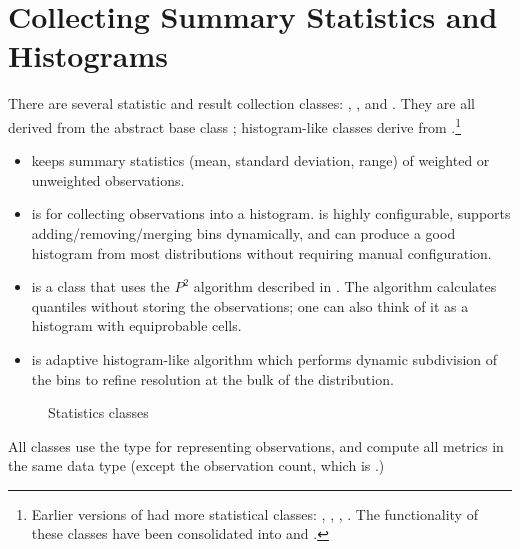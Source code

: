 \section{Collecting Summary Statistics and Histograms}
\label{sec:sim-lib:statistics}

There are several statistic and result collection classes:
, ,  and
. They are all derived from the abstract base class
; histogram-like classes derive from
.\footnote{Earlier versions of {\opp} had more
statistical classes: , ,
, . The functionality
of these classes have been consolidated into  and
.}

\begin{itemize}
  \item {} keeps summary statistics (mean, standard deviation,
    range) of weighted or unweighted observations.
  \item {} is for collecting observations into a histogram.
     is highly configurable, supports adding/removing/merging bins
    dynamically, and can produce a good histogram from most distributions
    without requiring manual configuration.
  \item {} is a class that uses the $P^{2}$ algorithm
    described in \cite{JCh85}. The algorithm calculates quantiles without
    storing the observations; one can also think of it as a histogram
    with equiprobable cells.
  \item {} is adaptive histogram-like algorithm
    which performs dynamic subdivision of the bins to refine resolution
    at the bulk of the distribution.
\end{itemize}

\begin{figure}[htbp]
  \begin{center}
    
    \caption{Statistics classes}
  \end{center}
\end{figure}

All classes use the  type for representing observations,
and compute all metrics in the same data type (except the observation
count, which is .)

